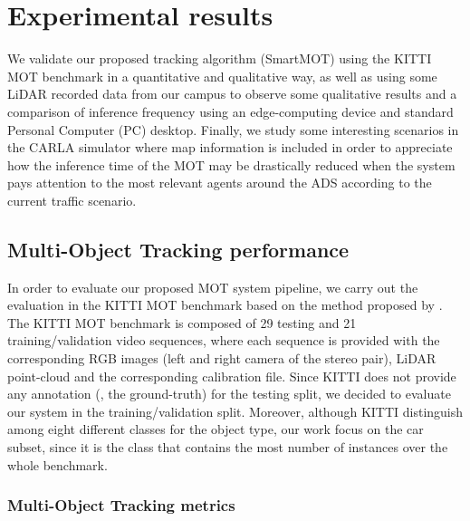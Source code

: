 \section{Experimental results}
\label{sec:4_mot}

We validate our proposed tracking algorithm (SmartMOT) using the KITTI \ac{MOT} benchmark \cite{geiger2012we} in a quantitative and qualitative way, as well as using some \ac{LiDAR} recorded data from our campus to observe some qualitative results and a comparison of inference frequency using an edge-computing device and standard Personal Computer (PC) desktop. Finally, we study some interesting scenarios in the \ac{CARLA} simulator where map information is included in order to appreciate how the inference time of the \ac{MOT} may be drastically reduced when the system pays attention to the most relevant agents around the \ac{ADS} according to the current traffic scenario. 


\subsection{Multi-Object Tracking performance}
\label{subsec:4_mot_results}

In order to evaluate our proposed \ac{MOT} system pipeline, we carry out the evaluation in the KITTI \ac{MOT} benchmark \cite{geiger2012we} based on the method proposed by \cite{weng20203d}. The KITTI \ac{MOT} benchmark is composed of 29 testing and 21 training/validation video sequences, where each sequence is provided with the corresponding RGB images (left and right camera of the stereo pair), \ac{LiDAR} point-cloud and the corresponding calibration file. Since KITTI does not provide any annotation (\ie, the ground-truth) for the testing split, we decided to evaluate our system in the training/validation split. Moreover, although KITTI distinguish among eight different classes for the object type, our work focus on the car subset, since it is the class that contains the most number of instances over the whole benchmark.

\subsubsection{Multi-Object Tracking metrics}
\label{subsubsec:4_mot_metrics}

